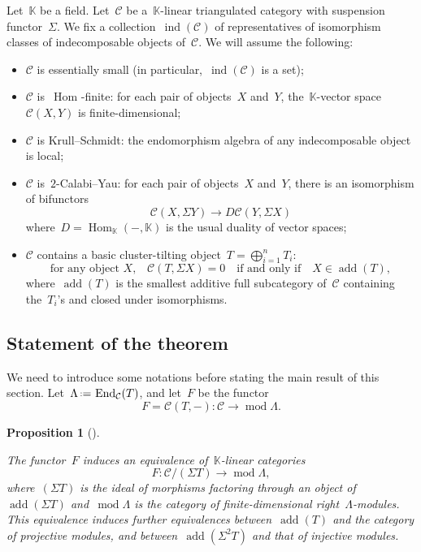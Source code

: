 \documentclass{amsart}
\newtheorem{proposition}[theorem]{Proposition}
\theoremstyle{definition}
\newcommand{\eqdef}{\mbox{\,\raisebox{0.2ex}{\scriptsize\ensuremath{\mathrm:}}\ensuremath{=}\,}} %
\newcommand{\field}{\mathbb{K}}
\newcommand{\cat}{\mathcal{C}}
\newcommand{\Hom}[1]{\operatorname{Hom}_{#1}}
\newcommand{\susp}{\Sigma}
\newcommand{\add}{\operatorname{add}}
\newcommand{\MOD}{\operatorname{mod}}
\newcommand{\End}[1]{\operatorname{End}_{#1}}
\newcommand{\ind}{\operatorname{ind}}
\begin{document}
Let~$\field$ be a field.  Let~$\cat$ be a~$\field$-linear triangulated category with suspension functor~$\susp$.  We fix a collection~$\ind(\cat)$ of representatives of isomorphism classes of indecomposable objects of~$\cat$. We will assume the following:
\begin{itemize}
 \item $\cat$ is essentially small (in particular,~$\ind(\cat)$ is a set);
 \item $\cat$ is~$\Hom{}$-finite: for each pair of objects~$X$ and~$Y$, the~$\field$-vector space~$\cat(X,Y)$ is finite-dimensional;
 \item $\cat$ is Krull--Schmidt: the endomorphism algebra of any indecomposable object is local;
 \item $\cat$ is~$2$-Calabi--Yau: for each pair of objects~$X$ and~$Y$, there is an isomorphism of bifunctors
 \[
  \cat(X,\susp Y) \to D\cat(Y,\susp X)
 \]
 where~$D=\Hom{\field}(-,\field)$ is the usual duality of vector spaces;
 \item $\cat$ contains a basic cluster-tilting object~$T=\bigoplus_{i=1}^n T_i$:
 \[
  \textrm{for any object~$X$,} \quad \cat(T, \susp X) = 0 \quad \textrm{if and only if} \quad X\in \add(T),
 \]
 where~$\add(T)$ is the smallest additive full subcategory of~$\cat$ containing the~$T_i$'s and closed under isomorphisms.
\end{itemize}


\subsection{Statement of the theorem}
\label{subsect::Statement cluster cats}

We need to introduce some notations before stating the main result of this section.  Let~$\Lambda\eqdef \End{\cat}(T)$, and let~$F$ be the functor
\[
F = \cat(T,-): \cat \xrightarrow{} \MOD \Lambda.
\]

\begin{proposition}[\cite{BuanMarshReiten, KellerReiten}]\label{prop::functor-F}

The functor~$F$ induces an equivalence of~$\field$-linear categories
 \[
  F:\cat/(\susp T) \xrightarrow{} \MOD \Lambda,
 \]
 where~$(\susp T)$ is the ideal of morphisms factoring through an object of~$\add(\susp T)$ and~$\MOD \Lambda$ is the category of finite-dimensional right~$\Lambda$-modules.  This equivalence induces further equivalences between~$\add(T)$ and the category of projective modules, and between~$\add(\susp^2 T)$ and that of injective modules.
\end{proposition}
\end{document}
